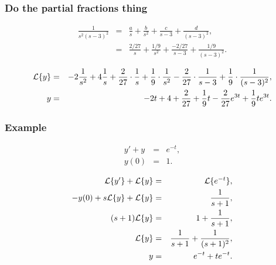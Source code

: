 \begin{frame}
  \frametitle{Do the partial fractions thing}

  \begin{eqnarray*}
    \frac{1}{s^2(s-3)^2} & = & \frac{a}{s} + \frac{b}{s^2} + \frac{c}{s-3} + \frac{d}{(s-3)^2}, \\
    & = & \frac{2/27}{s} + \frac{1/9}{s^2} + \frac{-2/27}{s-3} + \frac{1/9}{(s-3)^2}.
  \end{eqnarray*}

  {
    \begin{eqnarray*}
      \laplace{y} & = & -2 \frac{1}{s^2} + 4 \frac{1}{s} +
      \frac{2}{27}\cdot\frac{1}{s} + \frac{1}{9}\cdot\frac{1}{s^2} - \frac{2}{27}\cdot\frac{1}{s-3} +
      \frac{1}{9}\cdot\frac{1}{(s-3)^2}, \\
      y & = & -2t + 4 + \frac{2}{27}  + \frac{1}{9} t - \frac{2}{27}e^{3t} + \frac{1}{9} t e^{3t}.
    \end{eqnarray*}
  }

\end{frame}


\begin{frame}
  \frametitle{Example}

  \begin{eqnarray*}
    y' + y & = & e^{-t}, \\
    y(0) & = & 1.
  \end{eqnarray*}

  {
    \begin{eqnarray*}
      \laplace{y'} + \laplace{y} & = & \laplace{e^{-t}}, \\
        -y(0) + s \laplace{y} + \laplace{y} & = & \frac{1}{s+1}, \\
        (s+1) \laplace{y} & = & 1 + \frac{1}{s+1}, \\
        \laplace{y} & = & \frac{1}{s+1} + \frac{1}{(s+1)^2}, \\
        y & = & e^{-t} + t e^{-t}.
    \end{eqnarray*}
  }

\end{frame}


